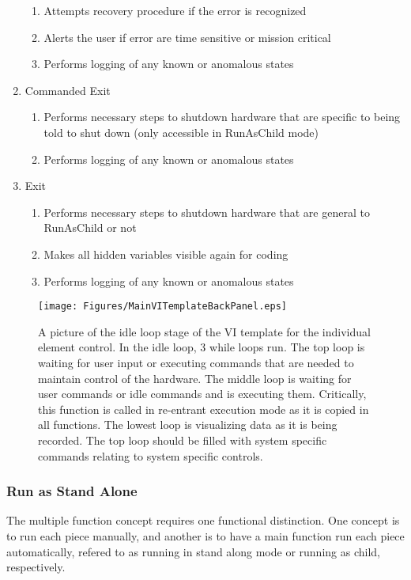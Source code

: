 \begin{enumerate}
\begin{enumerate}
		\item{Attempts recovery procedure if the error is recognized}
		\item{Alerts the user if error are time sensitive or mission critical}
		\item{Performs logging of any known or anomalous states}
	\end{enumerate}
	\item{Commanded Exit}
	\begin{enumerate}
		\item{Performs necessary steps to shutdown hardware that are specific to being told to shut down (only accessible in RunAsChild mode)}
		\item{Performs logging of any known or anomalous states}
	\end{enumerate}
	\item{Exit}
	\begin{enumerate}
		\item{Performs necessary steps to shutdown hardware that are general to RunAsChild or not}
		\item{Makes all hidden variables visible again for coding}
		\item{Performs logging of any known or anomalous states}
	\end{enumerate}
\end{enumerate}


\begin{figure}[!h]\centering
\texttt{[image: Figures/MainVITemplateBackPanel.eps]}
\caption{A picture of the idle loop stage of the VI template for the individual element control. In the idle loop, 3 while loops run. The top loop is waiting for user input or executing commands that are needed to maintain control of the hardware. The middle loop is waiting for user commands or idle commands and is executing them. Critically, this function is called in re-entrant execution mode as it is copied in all functions. The lowest loop is visualizing data as it is being recorded. The top loop should be filled with system specific commands relating to system specific controls.}\label{Fig:VITemplateBP}
\end{figure}


\subsubsection{Run as Stand Alone}

The multiple function concept requires one functional distinction. One concept is to run each piece manually, and another is to have a main function run each piece automatically, refered to as running in stand along mode or running as child, respectively.   

